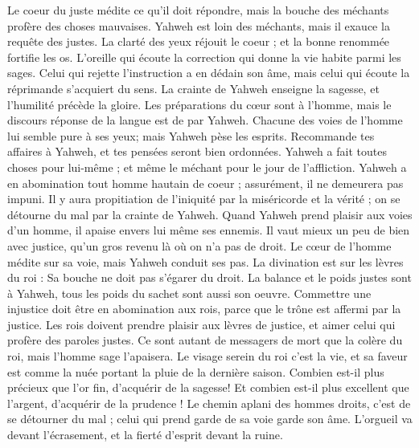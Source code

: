 \begin{multicols}{2}
Le coeur du juste médite ce qu'il doit répondre, mais la bouche des méchants profère des choses mauvaises.
Yahweh est loin des méchants, mais il exauce la requête des justes.
La clarté des yeux réjouit le coeur ; et la bonne renommée fortifie les os.
L'oreille qui écoute la correction qui donne la vie habite parmi les sages.
Celui qui rejette l'instruction a en dédain son âme, mais celui qui écoute la réprimande s'acquiert du sens.
La crainte de Yahweh enseigne la sagesse, et l'humilité précède la gloire.
\VerseOne{}Les préparations du cœur sont à l'homme, mais le discours réponse de la langue est de par Yahweh.
Chacune des voies de l'homme lui semble pure à ses yeux; mais Yahweh pèse les esprits.
Recommande tes affaires à Yahweh, et tes pensées seront bien ordonnées.
Yahweh a fait toutes choses pour lui-même ; et même le méchant pour le jour de l'affliction.
Yahweh a en abomination tout homme hautain de coeur ; assurément, il ne demeurera pas impuni.
Il y aura propitiation de l'iniquité par la miséricorde et la vérité ; on se détourne du mal par la crainte de Yahweh. 
Quand Yahweh prend plaisir aux voies d'un homme, il apaise envers lui même ses ennemis.
Il vaut mieux un peu de bien avec justice, qu'un gros revenu là où on n'a pas de droit.
Le cœur de l'homme médite sur sa voie, mais Yahweh conduit ses pas.
La divination est sur les lèvres du roi : Sa bouche ne doit pas s'égarer du droit.
La balance et le poids justes sont à Yahweh, tous les poids du sachet sont aussi son oeuvre.
Commettre une injustice doit être en abomination aux rois, parce que le trône est affermi par la justice.
Les rois doivent prendre plaisir aux lèvres de justice, et aimer celui qui profère des paroles justes.
Ce sont autant de messagers de mort que la colère du roi, mais l'homme sage l'apaisera.
Le visage serein du roi c'est la vie, et sa faveur est comme la nuée portant la pluie de la dernière saison.
Combien est-il plus précieux que l'or fin, d'acquérir de la sagesse! Et combien est-il plus excellent que l'argent, d'acquérir de la prudence ! 
Le chemin aplani des hommes droits, c'est de se détourner du mal ; celui qui prend garde de sa voie garde son âme.
L'orgueil va devant l'écrasement, et la fierté d'esprit devant la ruine.

\end{multicols}
